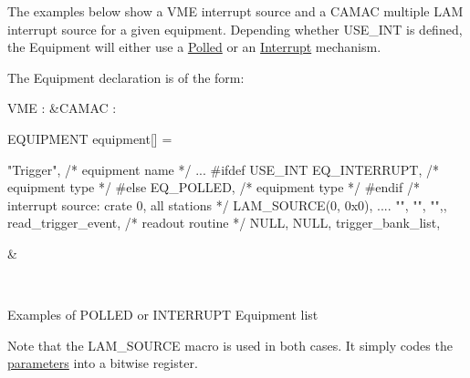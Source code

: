 The examples below show a VME interrupt source and a CAMAC multiple LAM interrupt source for a given equipment. Depending whether USE\_\-INT is defined, the Equipment will either use a \hyperlink{FE_eq_event_routines_FE_poll_event}{Polled} or an \hyperlink{FE_eq_event_routines_FE_interrupt_event}{Interrupt} mechanism. \par
 The Equipment declaration is of the form: \begin{table}[h]\begin{TabularC}{2}
\hline
VME :  &CAMAC :  \\

\begin{DoxyCode}
EQUIPMENT equipment[] = {

   {"Trigger",  /* equipment name */
     ...
#ifdef USE_INT
     EQ_INTERRUPT, /* equipment type */
#else
     EQ_POLLED,    /* equipment type */
#endif
 /* interrupt source: crate 0, all stations */
     LAM_SOURCE(0, 0x0),
     ....
     "", "", "",},
    read_trigger_event, /* readout routine */
    NULL, NULL,
    trigger_bank_list,
    }
\end{DoxyCode}
 &
\begin{DoxyCode}
    EQUIPMENT equipment[] = {
      { "Trigger",  // equipment name
         {    
            ...
// the same readout code will be used for
// either Interrupt or Polled equipment
#ifdef USE_INT
            EQ_INTERRUPT,
#else                     
            EQ_POLLED,
#endif
            LAM_SOURCE(JW_C,  LAM_STATION(GE_N)
                   | LAM_STATION(JW_N)), // interrupt source 
            ...
            "", "", "",},
       read_trigger_event,   // event readout routine 
       ...
\end{DoxyCode}
 \\
\end{TabularC}
\centering
\caption{Examples of POLLED or INTERRUPT Equipment list }
\end{table}


Note that the LAM\_\-SOURCE macro is used in both cases. It simply codes the \hyperlink{structparameters}{parameters} into a bitwise register.

